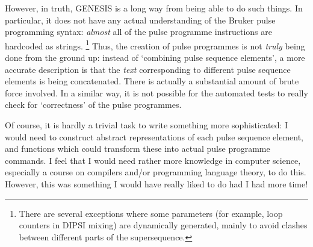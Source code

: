 However, in truth, GENESIS is a long way from being able to do such things.
In particular, it does not have any actual understanding of the Bruker pulse programming syntax: \textit{almost} all of the pulse programme instructions are hardcoded as strings.%
\footnote{There are several exceptions where some parameters (for example, loop counters in DIPSI mixing) are dynamically generated, mainly to avoid clashes between different parts of the supersequence.}
Thus, the creation of pulse programmes is not \textit{truly} being done from the ground up: instead of `combining pulse sequence elements', a more accurate description is that the \textit{text} corresponding to different pulse sequence elements is being concatenated.
There is actually a substantial amount of brute force involved.
In a similar way, it is not possible for the automated tests to really check for `correctness' of the pulse programmes.

Of course, it is hardly a trivial task to write something more sophisticated: I would need to construct abstract representations of each pulse sequence element, and functions which could transform these into actual pulse programme commands.
I feel that I would need rather more knowledge in computer science, especially a course on compilers and/or programming language theory, to do this.
However, this was something I would have really liked to do had I had more time!

